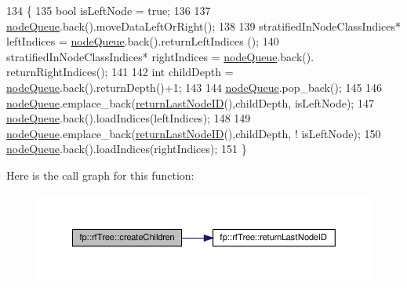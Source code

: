 \begin{DoxyCode}
134                                             \{
135                     \textcolor{keywordtype}{bool} isLeftNode = \textcolor{keyword}{true};
136 
137                         \hyperlink{classfp_1_1rfTree_af72d0a2f930fd480dfb4858885c2df23}{nodeQueue}.back().moveDataLeftOrRight();
138 
139                     stratifiedInNodeClassIndices* leftIndices = \hyperlink{classfp_1_1rfTree_af72d0a2f930fd480dfb4858885c2df23}{nodeQueue}.back().returnLeftIndices
      ();
140                     stratifiedInNodeClassIndices* rightIndices = \hyperlink{classfp_1_1rfTree_af72d0a2f930fd480dfb4858885c2df23}{nodeQueue}.back().
      returnRightIndices();
141 
142                     \textcolor{keywordtype}{int} childDepth = \hyperlink{classfp_1_1rfTree_af72d0a2f930fd480dfb4858885c2df23}{nodeQueue}.back().returnDepth()+1;
143 
144                     \hyperlink{classfp_1_1rfTree_af72d0a2f930fd480dfb4858885c2df23}{nodeQueue}.pop\_back();
145 
146                     \hyperlink{classfp_1_1rfTree_af72d0a2f930fd480dfb4858885c2df23}{nodeQueue}.emplace\_back(\hyperlink{classfp_1_1rfTree_a1b8c04f3f3ce362d9627c2ca66d10efd}{returnLastNodeID}(),childDepth, 
      isLeftNode);
147                     \hyperlink{classfp_1_1rfTree_af72d0a2f930fd480dfb4858885c2df23}{nodeQueue}.back().loadIndices(leftIndices);
148 
149                     \hyperlink{classfp_1_1rfTree_af72d0a2f930fd480dfb4858885c2df23}{nodeQueue}.emplace\_back(\hyperlink{classfp_1_1rfTree_a1b8c04f3f3ce362d9627c2ca66d10efd}{returnLastNodeID}(),childDepth, !
      isLeftNode);
150                     \hyperlink{classfp_1_1rfTree_af72d0a2f930fd480dfb4858885c2df23}{nodeQueue}.back().loadIndices(rightIndices);
151                 \}
\end{DoxyCode}
Here is the call graph for this function\+:
\nopagebreak
\begin{figure}[H]
\begin{center}
\leavevmode
\includegraphics[width=350pt]{classfp_1_1rfTree_ad226037e7f93c0fa2a1a960e19a87bed_cgraph}
\end{center}
\end{figure}
\mbox{\label{classfp_1_1rfTree_ad226037e7f93c0fa2a1a960e19a87bed}} 
